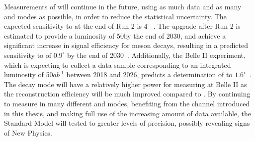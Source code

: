 Measurements of \Pgamma will continue in the future, using as much data and as many \B and \D modes as possible, in order to reduce the statistical uncertainty. The expected sensitivity to \Pgamma at the end of Run 2 is $4^{\circ}$~\cite{LHCb-PAPER-2012-031}. The upgrade after Run 2 is estimated to provide a luminosity of 50\invfb by the end of 2030, and achieve a significant increase in signal efficiency for \B meson decays, resulting in a predicted sensitivity to \Pgamma of $0.9^{\circ}$ by the end of 2030~\cite{LHCb-PAPER-2012-031}. Additionally, the Belle II experiment, which is expecting to collect a data sample corresponding to an integrated luminosity of 50$ab^{\text{-1}}$ between 2018 and 2026, predicts a determination of \Pgamma to $1.6^{\circ}$~\cite{BelleII}. The \decay{\Bm}{\D\Kstarm(\KS\pim)} decay mode will have a relatively higher power for measuring \Pgamma at Belle II as the \KS reconstruction efficiency will be much improved compared to \lhcb. By continuing to measure \Pgamma in many different \B and \D modes, benefiting from the \btodkst channel introduced in this thesis, and making full use of the increasing amount of data available, the Standard Model will tested to greater levels of precision, possibly revealing signs of New Physics.

\clearpage